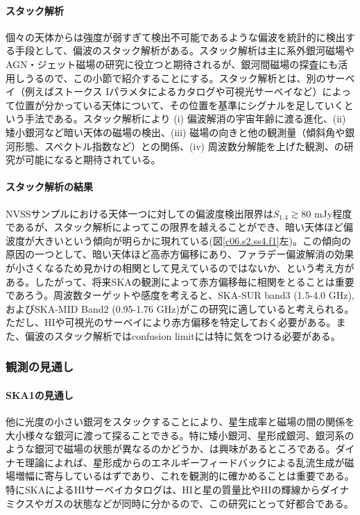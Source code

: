 \paragraph{スタック解析}

個々の天体からは強度が弱すぎて検出不可能であるような偏波を統計的に検出する手段として、偏波のスタック解析がある。スタック解析は主に系外銀河磁場やAGN・ジェット磁場の研究に役立つと期待されるが、銀河間磁場の探査にも活用しうるので、この小節で紹介することにする。スタック解析とは、別のサーベイ（例えばストークス Iパラメタによるカタログや可視光サーベイなど）によって位置が分かっている天体について、その位置を基準にシグナルを足していくという手法である。スタック解析により (i) 偏波解消の宇宙年齢に渡る進化、(ii) 矮小銀河など暗い天体の磁場の検出、(iii) 磁場の向きと他の観測量（傾斜角や銀河形態、スペクトル指数など）との関係、(iv) 周波数分解能を上げた観測、の研究が可能になると期待されている。

\paragraph{スタック解析の結果}

NVSSサンプルにおける天体一つに対しての偏波度検出限界は$S_{1.4}\gtrsim 80$ mJy程度であるが、スタック解析によってこの限界を越えることができ、暗い天体ほど偏波度が大きいという傾向が明らかに現れている(図\ref{c06.s2.ss4.f1}左)。この傾向の原因の一つとして、暗い天体ほど高赤方偏移にあり、ファラデー偏波解消の効果が小さくなるため見かけの相関として見えているのではないか、という考え方がある\citep{2002A&A...396..463M}。したがって、将来SKAの観測によって赤方偏移毎に相関をとることは重要であろう。周波数ターゲットや感度を考えると、SKA-SUR band3 (1.5-4.0 GHz), およびSKA-MID Band2 (0.95-1.76 GHz)がこの研究に適していると考えられる。ただし、HIや可視光のサーベイにより赤方偏移を特定しておく必要がある。また、偏波のスタック解析ではconfusion limitには特に気をつける必要がある。

\subsubsection{観測の見通し}
\label{c06.s2.ss7.sss2}

\paragraph{SKA1の見通し}

他に光度の小さい銀河をスタックすることにより、星生成率と磁場の間の関係を大小様々な銀河に渡って探ることできる。特に矮小銀河、星形成銀河、銀河系のような銀河で磁場の状態が異なるのかどうか、は興味があるところである。ダイナモ理論によれば、星形成からのエネルギーフィードバックによる乱流生成が磁場増幅に寄与しているはずであり、これを観測的に確かめることは重要である。特にSKAによるHIサーベイカタログは、HIと星の質量比やHIの輝線からダイナミクスやガスの状態などが同時に分かるので、この研究にとって好都合である。


